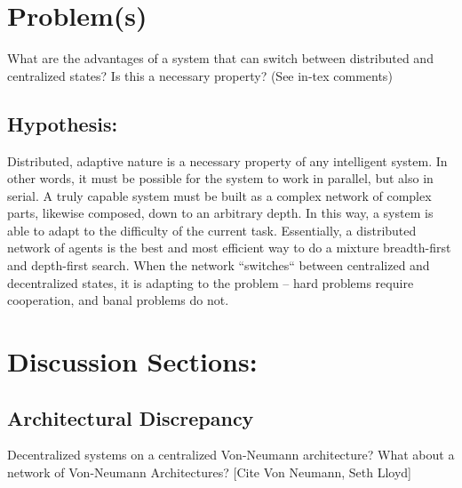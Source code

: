 \documentclass{nature}
\begin{document}
\section{Problem(s)}

What are the advantages of a system that can switch between distributed and centralized states?
Is this a necessary property?
(See in-tex comments)

\subsection{Hypothesis:}
Distributed, adaptive nature is a necessary property of any intelligent system.
In other words, it must be possible for the system to work in parallel, but also in serial.
A truly capable system must be built as a complex network of complex parts, likewise composed, down to an arbitrary depth.
In this way, a system is able to adapt to the difficulty of the current task. 
Essentially, a distributed network of agents is the best and most efficient way to do a mixture breadth-first and depth-first search.
When the network ``switches`` between centralized and decentralized states, it is adapting to the problem -- hard problems require cooperation, and banal problems do not.

\section{Discussion Sections:}
\subsection{Architectural Discrepancy}
    Decentralized systems on a centralized Von-Neumann architecture? What about a network of Von-Neumann Architectures?
    [Cite Von Neumann, Seth Lloyd]
\end{document}
